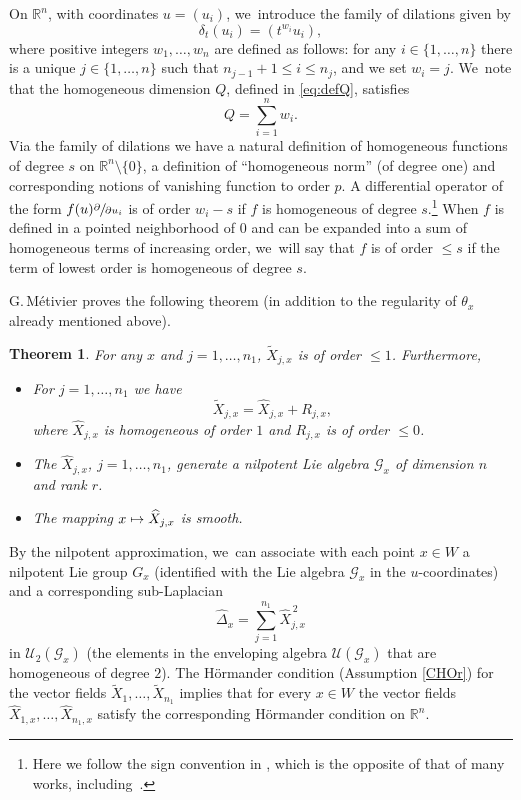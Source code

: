 \documentclass[11pt]{article}
\newcommand\mto{\mathchoice{\longmapsto}{\mapsto}{\mapsto}{\mapsto}}
\let\oldsfrac\sfrac
\renewcommand{\sfrac}[2]{{\oldsfrac{#1}{#2}}}
\newtheorem{theorem}{Theorem}[section]
\theoremstyle{definition}
\newcommand{\1}{\mathbbm{1}}
\newcommand{\R}{\mathbb{R}}
\numberwithin{equation}{section}
\begin{document}
On $\mathbb R^n$, with coordinates $u=(u_{i})$, we~introduce the family of dilations given by
\begin{equation}
\label{eq:dilation}
\delta_t (u_{i}) = (t^{w_i} u_{i}),
\end{equation}
where positive integers $w_1,\ldots,w_n$ are defined as follows: for any $i\in\{1,\ldots,n\}$ there is a unique $j\in\{1,\ldots,n\}$ such that $n_{j-1}+1 \leq i\leq n_j$, and we set $w_i=j$. We~note that the homogeneous dimension $Q$, defined in \eqref{eq:defQ}, satisfies
\begin{equation}\label{eq:defQa}
Q =\sum_{i=1}^n w_i.
\end{equation}
Via the family of dilations we have a natural definition of homogeneous functions of degree $s$ on $\mathbb R^n\setminus\{0\}$, a definition of ``homogeneous norm'' (of degree one) and corresponding notions of vanishing function to order $p$.
A differential operator of the form
$f(u) \sfrac{\partial}{\partial u_{i}}$ is of order $w_i -s$ if $f$ is homogeneous of degree $s$.\footnote{Here we follow the sign convention in \cite{Me}, which is the opposite of that of many works, including~\cite{Je}.} When $f$ is defined in a pointed neighborhood of $0$ and can be expanded into a sum of homogeneous terms of increasing order, we~will say that $f$ is of order $\leq s$ if the term of lowest order is homogeneous of degree $s$.

G.\,Métivier \cite[Th.\,3.1]{Me} proves the following theorem (in addition to the regularity of $\theta_x$ already mentioned above).

\begin{theorem}\label{lemmaMet}
For any $x$ and $j=1,\ldots,n_1$, $\tilde X_{j,x}$ is of order $\leq 1$. Furthermore,
\begin{itemize}
\item For $j=1,\ldots,n_1$ we have
\[
\tilde X_{j,x} = \widehat X_{j,x} + R_{j,x},
\]
where $\widehat X_{j,x}$ is homogeneous of order $1$ and $R_{j,x}$ is of order $\leq 0$.
\item
The $\widehat X_{j,x}$, $j=1,\ldots,n_1$, generate a nilpotent Lie algebra $\mathcal G_x$ of dimension $n$ and rank $r$.
\item
The mapping $x \mto \widehat X_{j,x}$ is smooth.
\end{itemize}
\end{theorem}

By the nilpotent approximation, we~can associate with each point $x\in W$ a nilpotent Lie group $G_x$ (identified with the Lie algebra $\mathcal G_x$ in the $u$-coordinates) and a corresponding sub-Laplacian
\[
\widehat \Delta_x= \sum_{j=1}^{n_1} \widehat X_{j,x}^{\,2}
\]
in $\mathcal U_2(\mathcal G_x)$ (the elements in the enveloping algebra $\mathcal U(\mathcal G_x)$ that are homogeneous of degree $2$). The Hörmander condition (Assumption \ref{CHOr}) for the vector fields $\tilde X_1,\ldots,\tilde X_{n_1}$ implies that for every $x\in W$ the vector fields $\widehat X_{1,x},\ldots,\widehat X_{n_1,x}$ satisfy the corresponding Hörmander condition on $\R^n$.
\end{document}
